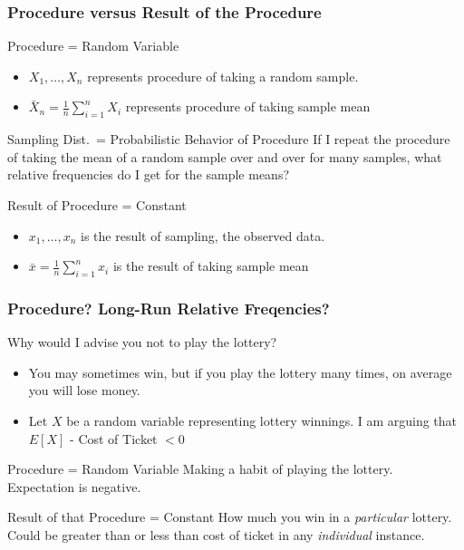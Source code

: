 \documentclass[handout]{beamer}
\begin{document}
\begin{frame}
\frametitle{Procedure versus Result of the Procedure}
\begin{block}{Procedure = Random Variable}
\begin{itemize}
\item $X_1, \hdots, X_n$ represents \alert{procedure of taking a random sample}. 
\item $\bar{X}_n = \frac{1}{n}\sum_{i=1}^n X_i$ represents \alert{procedure of taking sample mean}  
\end{itemize}
\end{block}
\pause
\begin{block}{Sampling Dist.\ = Probabilistic Behavior of Procedure}
If I repeat the procedure of taking the mean of a random sample over and over for many samples, what relative frequencies do I get \alert{for the sample means?}
\end{block}

\pause
\begin{block}{Result of Procedure = Constant}
 \begin{itemize}
\item $x_1, \hdots, x_n$ is the  \alert{result of sampling}, the observed data. 
\item $\bar{x} = \frac{1}{n}\sum_{i=1}^n x_i$ is the \alert{result of taking sample mean}  
\end{itemize}
\end{block}


\end{frame}
\begin{frame}
\frametitle{Procedure? Long-Run Relative Freqencies?}

Why would I advise you not to play the lottery?
\pause
	\begin{itemize}
		\item You may sometimes win, but if you play the lottery many times, on average you will lose money. \pause
		\item Let $X$ be a random variable representing lottery winnings. I am arguing that $E[X]$ - Cost of Ticket $< 0$
	\end{itemize}
\pause
\begin{block}{Procedure = Random Variable}
Making a habit of playing the lottery. Expectation is negative.
\end{block}
\pause
\begin{block}{Result of that Procedure = Constant}
How much you win in a \emph{particular} lottery. Could be greater than or less than cost of ticket in any \emph{individual} instance.
\end{block}
\end{frame}
\end{document}
